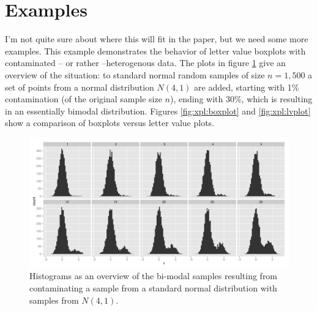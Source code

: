 \documentclass[12pt,oneside]{article}
\begin{document}
\section{Examples}
I'm not quite sure about where this will fit in the paper, but we need some more examples.
This example demonstrates the behavior of letter value boxplots with contaminated -- or rather --heterogenous data.
The plots in figure \ref{fig:xpl:histogram} give an overview of the situation: to  standard normal random samples of size $n= 1,500$ a set of points from a normal distribution $N(4,1)$ are added, starting with 1\% contamination (of the original sample size $n$), ending with 30\%, which is resulting in an essentially bimodal distribution. Figures \ref{fig:xpl:boxplot} and \ref{fig:xpl:lvplot} show a comparison of boxplots versus letter value plots.  
\begin{figure}[htbp] %
   \centering
   \includegraphics[width=\textwidth]{xpl-histogram} 
   \caption{Histograms as an overview of the bi-modal samples resulting from contaminating a sample from a standard normal distribution with samples from $N(4,1)$.}
   \label{fig:xpl:histogram}
\end{figure}
\end{document}
